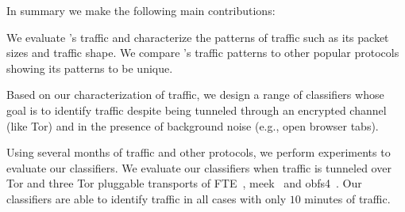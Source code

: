  
 
 





In summary we make the following main contributions:

\begin{compactenum}
	\item We evaluate \bc's traffic and characterize the patterns of \bc traffic such as its packet sizes and traffic shape. We compare \bc's traffic patterns to other popular protocols showing its patterns to be unique.  
	\item Based on our characterization of \bc traffic, we design a range of classifiers whose goal is to identify \bc traffic despite being tunneled through an encrypted channel (like Tor) and in the presence of background noise (e.g., open browser tabs). 
	\item Using several months of \bc traffic and other protocols, we perform experiments to evaluate our classifiers. We evaluate our classifiers when \bc traffic is tunneled over Tor and three Tor pluggable transports of FTE~\cite{fte}, meek~\cite{meek} and obfs4~\cite{obfsproxy}. Our classifiers are able to identify \bc traffic in all cases with only $10$ minutes of traffic.
\end{compactenum}



